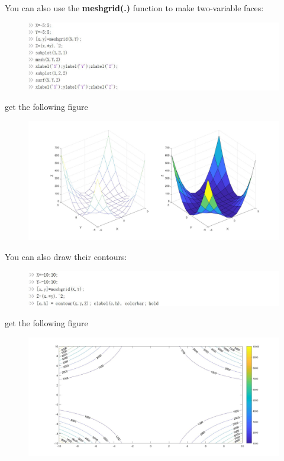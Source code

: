 \documentclass[10pt,math=newtx,citestyle=gb7714-2015,bibstyle=gb7714-2015]{elegantbook}
\begin{document}
{{{	You can also use the \textbf{meshgrid(.)} function to make two-variable faces:
	\begin{figure}[htbp!]
		\centering
		\includegraphics[width=0.8\linewidth]{FIG/surf.jpg}
		\centering
	\end{figure}
	
	get the following figure
	\begin{figure}[htbp!]
		\centering
		\includegraphics[width=0.8\linewidth]{FIG/surf1.jpg}
		\centering
	\end{figure}
	
	You can also draw their contours:
	
	\begin{figure}[htbp!]
		\centering
		\includegraphics[width=0.8\linewidth]{FIG/contours}
		\centering
	\end{figure}
	
	get the following figure
	\begin{figure}[htbp!]
		\centering
		\includegraphics[width=0.8\linewidth]{FIG/contours1}
		\centering
	\end{figure}
	
}}}
\end{document}

